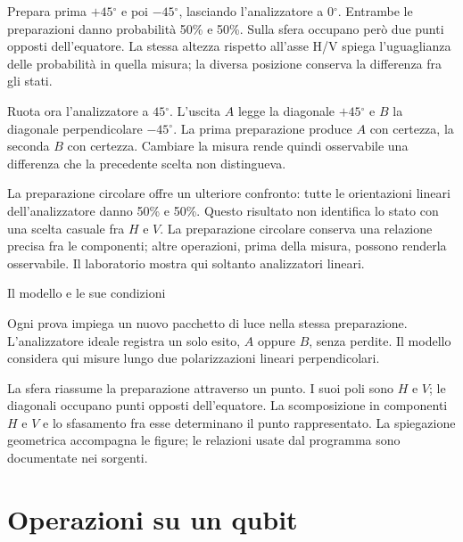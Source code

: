 Prepara prima \(+45{}^{\circ} \) e poi \(- 45{}^{\circ} \), lasciando l'analizzatore a \(0{}^{\circ} \). Entrambe le preparazioni danno probabilità 50\% e 50\%. Sulla sfera occupano però due punti opposti dell'equatore. La stessa altezza rispetto all'asse H/V spiega l'uguaglianza delle probabilità in quella misura; la diversa posizione conserva la differenza fra gli stati.\par

Ruota ora l'analizzatore a \(45{}^{\circ} \). L'uscita \(A\) legge la diagonale \(+45{}^{\circ} \) e \(B\) la diagonale perpendicolare \(- 45{}^{\circ} \). La prima preparazione produce \(A\) con certezza, la seconda \(B\) con certezza. Cambiare la misura rende quindi osservabile una differenza che la precedente scelta non distingueva.\par

La preparazione circolare offre un ulteriore confronto: tutte le orientazioni lineari dell'analizzatore danno 50\% e 50\%. Questo risultato non identifica lo stato con una scelta casuale fra \(H\) e \(V\). La preparazione circolare conserva una relazione precisa fra le componenti; altre operazioni, prima della misura, possono renderla osservabile. Il laboratorio mostra qui soltanto analizzatori lineari.\par


Il modello e le sue condizioni\par

Ogni prova impiega un nuovo pacchetto di luce nella stessa preparazione. L'analizzatore ideale registra un solo esito, \(A\) oppure \(B\), senza perdite. Il modello considera qui misure lungo due polarizzazioni lineari perpendicolari.\par

La sfera riassume la preparazione attraverso un punto. I suoi poli sono \(H\) e \(V\); le diagonali occupano punti opposti dell'equatore. La scomposizione in componenti \(H\) e \(V\) e lo sfasamento fra esse determinano il punto rappresentato. La spiegazione geometrica accompagna le figure; le relazioni usate dal programma sono documentate nei sorgenti.\par



\Needspace{.43\textheight}
\section{Operazioni su un qubit}
\label{c1-calcolo}

